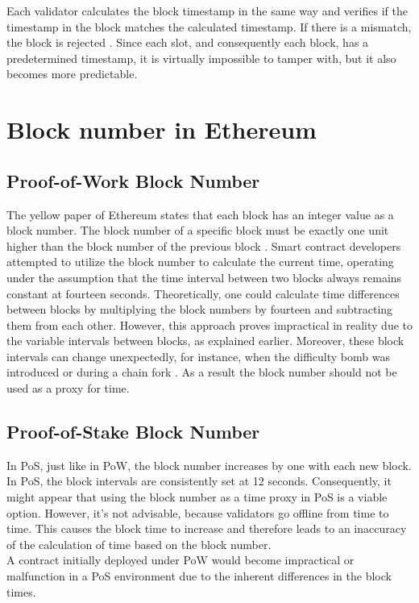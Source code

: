 Each validator calculates the block timestamp in the same way and verifies if
the timestamp in the block matches the calculated timestamp. If there is a
mismatch, the block is rejected \cite{process-execution-payload}. Since each
slot, and consequently each block, has a predetermined timestamp, it is
virtually impossible to tamper with, but it also becomes more predictable.

\section{Block number in Ethereum}
\subsection{Proof-of-Work Block Number}
The yellow paper of Ethereum states that each block has
an integer value as a block number. The block number
of a specific block must be exactly one unit higher than the block
number of the previous block \cite{ethyellowpaper2023}.
Smart contract developers attempted to utilize the block number to calculate
the current time, operating under the assumption that the time interval between
two blocks always remains constant at fourteen seconds. Theoretically, one could
calculate time differences between blocks by multiplying the block numbers by fourteen 
and subtracting them from each other.
However, this approach proves impractical in reality due to the variable
intervals between blocks, as explained earlier. Moreover, these block intervals
can change unexpectedly, for instance, when the difficulty bomb was introduced
or during a chain fork \cite{swc116}.
As a result the block number should not be used as a proxy for time.

%

\subsection{Proof-of-Stake Block Number}
In PoS, just like in PoW, the block number increases by one with each new block.
In PoS, the block intervals are consistently set at 12 seconds.
Consequently, it might appear that using the block number as a time proxy in PoS is a viable option. 
However, it's not advisable, because validators go offline from time to time.
This causes the block time to increase and therefore leads to an inaccuracy of the calculation
of time based on the block number. \\
A contract initially deployed under PoW would
become impractical or malfunction in a PoS environment due to the inherent differences in the block times.

